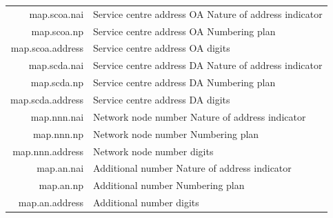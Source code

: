 \documentclass[a4paper,latin]{paper}
\begin{document}
\begin{tabularx}{\linewidth}{ | >{\ttfamily} r | >{\ttfamily} X |}
	map.scoa.nai				& Service centre address OA Nature of address indicator\\
	map.scoa.np				& Service centre address OA Numbering plan\\
	map.scoa.address			& Service centre address OA digits\\
	map.scda.nai				& Service centre address DA Nature of address indicator\\
	map.scda.np				& Service centre address DA Numbering plan\\
	map.scda.address			& Service centre address DA digits\\
	map.nnn.nai				& Network node number Nature of address indicator\\
	map.nnn.np				& Network node number Numbering plan\\
	map.nnn.address				& Network node number digits\\
	map.an.nai				& Additional number Nature of address indicator\\
	map.an.np				& Additional number Numbering plan\\
	map.an.address				& Additional number digits\\
	\hline
\end{tabularx}%
\clearpage
\end{document}
